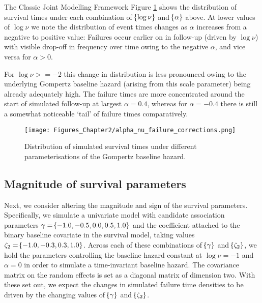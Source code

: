\begin{chapter}{\label{cha:methods-classic}The Classic Joint Modelling Framework}
  Figure \ref{fig:sim-alphanu} shows the distribution of survival times under each combination of $\!\left\{\log\nu\right\}$ and $\!\left\{\alpha\right\}$ above. At lower values of $\log\nu$ we note the distribution of event times changes as $\alpha$ increases from a negative to positive value: Failures occur earlier on in follow-up (driven by $\log\nu$) with visible drop-off in frequency over time owing to the negative $\alpha$, and vice versa for $\alpha>0$.

  For $\log\nu>=-2$ this change in distribution is less pronounced owing to the underlying Gompertz baseline hazard (arising from this scale parameter) being already adequately high. The failure times are more concentrated around the start of simulated follow-up at largest $\alpha=0.4$, whereas for $\alpha=-0.4$ there is still a somewhat noticeable `tail' of failure times comparatively.
  \begin{figure}[t]
    \centering
    \texttt{[image: Figures\_Chapter2/alpha\_nu\_failure\_corrections.png]}
    \caption{Distribution of simulated survival times under different parameterisations of the Gompertz baseline hazard.}
  \label{fig:sim-alphanu}
  \end{figure}
  
  \subsection{Magnitude of survival parameters}\label{sec:sim-considerations-gammazeta}
  Next, we consider altering the magnitude and sign of the survival parameters. Specifically, we simulate a univariate model with candidate association parameters $\gamma=\!\left\{-1.0, -0.5, 0.0, 0.5, 1.0\right\}$ and the coefficient attached to the binary baseline covariate in the survival model, taking values $\zeta_2=\!\left\{-1.0, -0.3, 0.3, 1.0\right\}$. Across each of these combinations of $\!\left\{\gamma\right\}$ and $\!\left\{\zeta_2\right\}$, we hold the parameters controlling the baseline hazard constant at $\log\nu=-1$ and $\alpha = 0$ in order to simulate a time-invariant baseline hazard. The covariance matrix on the random effects is set as a diagonal matrix of dimension two. With these set out, we expect the changes in simulated failure time densities to be driven by the changing values of $\!\left\{\gamma\right\}$ and $\!\left\{\zeta_2\right\}$.
  

\end{chapter}

